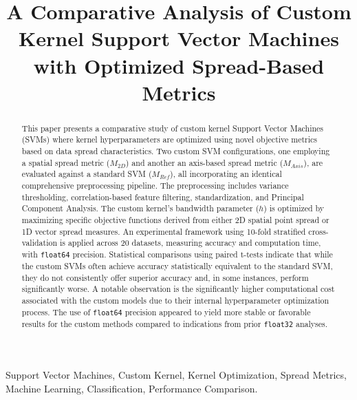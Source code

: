\documentclass[conference]{IEEEtran} %
\begin{document}
\title{A Comparative Analysis of Custom Kernel Support Vector Machines with Optimized Spread-Based Metrics}

\author{
}

\maketitle

\begin{abstract}
This paper presents a comparative study of custom kernel Support Vector Machines (SVMs) where kernel hyperparameters are optimized using novel objective metrics based on data spread characteristics. Two custom SVM configurations, one employing a spatial spread metric ($M_{2D}$) and another an axis-based spread metric ($M_{Axis}$), are evaluated against a standard SVM ($M_{Ref}$), all incorporating an identical comprehensive preprocessing pipeline. The preprocessing includes variance thresholding, correlation-based feature filtering, standardization, and Principal Component Analysis. The custom kernel's bandwidth parameter ($h$) is optimized by maximizing specific objective functions derived from either 2D spatial point spread or 1D vector spread measures. An experimental framework using 10-fold stratified cross-validation is applied across 20 datasets, measuring accuracy and computation time, with \texttt{float64} precision. Statistical comparisons using paired t-tests indicate that while the custom SVMs often achieve accuracy statistically equivalent to the standard SVM, they do not consistently offer superior accuracy and, in some instances, perform significantly worse. A notable observation is the significantly higher computational cost associated with the custom models due to their internal hyperparameter optimization process. The use of \texttt{float64} precision appeared to yield more stable or favorable results for the custom methods compared to indications from prior \texttt{float32} analyses.
\end{abstract}

\begin{IEEEkeywords}
Support Vector Machines, Custom Kernel, Kernel Optimization, Spread Metrics, Machine Learning, Classification, Performance Comparison.
\end{IEEEkeywords}
\end{document}
